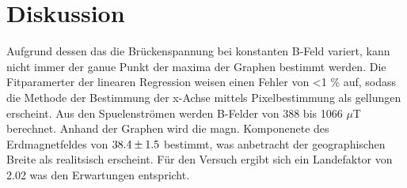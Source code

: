 \section{Diskussion}
\label{sec:Diskussion}
Aufgrund dessen das die Brückenspannung bei konstanten B-Feld variert, kann nicht immer der ganue Punkt der maxima der Graphen bestimmt werden. Die Fitparamerter der linearen Regression weisen einen Fehler von <1 \% auf, sodass die Methode der Bestimmung der x-Achse mittels Pixelbestimmung als gellungen erscheint. Aus den Spuelenströmen werden B-Felder von 388 bis 1066 $\mu$T berechnet. Anhand der Graphen wird die magn. Komponenete des Erdmagnetfeldes von $\num{38.4 +- 1.5}$ bestimmt, was anbetracht der geographischen Breite als realitsisch erscheint. Für den Versuch ergibt sich ein Landefaktor von 2.02 was den Erwartungen entspricht. 
